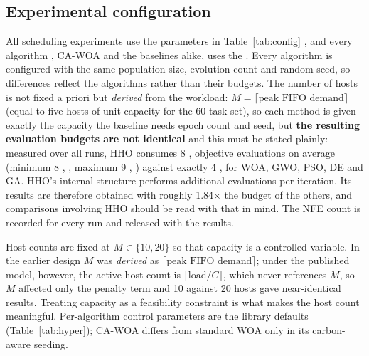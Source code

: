 \documentclass[12pt,a4paper]{article}
\providecommand{\DIFaddtex}[1]{{\protect\color{blue} \sf #1}} %
\providecommand{\DIFdeltex}[1]{{\protect\color{red} \scriptsize #1}} %
\providecommand{\DIFaddbegin}{} %
\providecommand{\DIFaddend}{} %
\providecommand{\DIFdelbegin}{} %
\providecommand{\DIFdelend}{} %
\providecommand{\DIFadd}[1]{\texorpdfstring{\DIFaddtex{#1}}{#1}} %
\providecommand{\DIFdel}[1]{\texorpdfstring{\DIFdeltex{#1}}{}} %
\providecommand{\DIFscaledelfig}{0.5}
\newlength{\DIFdelgraphicswidth} %
\newlength{\DIFdelgraphicsheight} %
\providecommand{\DIFaddincludegraphics}[2][]{{\color{blue}\fbox{\DIFOincludegraphics[#1]{#2}}}} %
\providecommand{\DIFdelincludegraphics}[2][]{%
\sbox{\DIFdelgraphicsbox}{\DIFOincludegraphics[#1]{#2}}%
\settoboxwidth{\DIFdelgraphicswidth}{\DIFdelgraphicsbox} %
\settoboxtotalheight{\DIFdelgraphicsheight}{\DIFdelgraphicsbox} %
\scalebox{\DIFscaledelfig}{%
\parbox[b]{\DIFdelgraphicswidth}{\usebox{\DIFdelgraphicsbox}\\[-\baselineskip] \rule{\DIFdelgraphicswidth}{0em}}\llap{\resizebox{\DIFdelgraphicswidth}{\DIFdelgraphicsheight}{%
\setlength{\unitlength}{\DIFdelgraphicswidth}%
\begin{picture}(1,1)%
\thicklines\linethickness{2pt} %
{\color[rgb]{1,0,0}\put(0,0){\framebox(1,1){}}}%
{\color[rgb]{1,0,0}\put(0,0){\line( 1,1){1}}}%
{\color[rgb]{1,0,0}\put(0,1){\line(1,-1){1}}}%
\end{picture}%
}\hspace*{3pt}}} %
} %
\DeclareRobustCommand{\DIFaddbegin}{\DIFOaddbegin \let\includegraphics\DIFaddincludegraphics} %
\DeclareRobustCommand{\DIFaddend}{\DIFOaddend \let\includegraphics\DIFOincludegraphics} %
\DeclareRobustCommand{\DIFdelbegin}{\DIFOdelbegin \let\includegraphics\DIFdelincludegraphics} %
\DeclareRobustCommand{\DIFdelend}{\DIFOaddend \let\includegraphics\DIFOincludegraphics} %
\begin{document}
\subsection{Experimental configuration}\label{sec:config}
All scheduling experiments use the parameters in Table~\ref{tab:config}\DIFdelbegin \DIFdel{, and every algorithm , CA-WOA
and the baselines alike, uses the }\DIFdelend \DIFaddbegin \DIFadd{. Every algorithm is configured with
the }\DIFaddend same population size, \DIFdelbegin \DIFdel{evolution count and random seed, so
differences reflect the algorithms rather than their budgets.
The number of hosts is not fixed a priori
but \emph{derived} from the workload: $M=\lceil\text{peak FIFO demand}\rceil$ (equal to five hosts of
unit capacity for the 60-task set), so each method is given exactly the capacity the baseline needs}\DIFdelend \DIFaddbegin \DIFadd{epoch count and seed, but \textbf{the resulting evaluation budgets are not
identical} and this must be stated plainly: measured over all runs, HHO consumes 8}{\DIFadd{,}}\DIFadd{908 objective evaluations
on average (minimum 8}{\DIFadd{,}}\DIFadd{698, maximum 9}{\DIFadd{,}}\DIFadd{136) against exactly 4}{\DIFadd{,}}\DIFadd{840 for WOA, GWO, PSO, DE and GA. HHO's
internal structure performs additional evaluations per iteration. Its results are therefore obtained with
roughly 1.84$\times$ the budget of the others, and comparisons involving HHO should be read with that in mind.
The NFE count is recorded for every run and released with the results.
}

\DIFadd{Host counts are fixed at $M\in\{10,20\}$ so that capacity is a controlled variable. In the earlier design $M$
was \emph{derived} as $\lceil\text{peak FIFO demand}\rceil$; under the published model, however, the active
host count is $\lceil\text{load}/C\rceil$, which never references $M$, so $M$ affected only the penalty term
and 10 against 20 hosts gave near-identical results. Treating capacity as a feasibility constraint is what
makes the host count meaningful}\DIFaddend .
Per-algorithm control parameters are the library defaults (Table~\ref{tab:hyper}); CA-WOA differs from
standard WOA only in its carbon-aware seeding.
\end{document}
